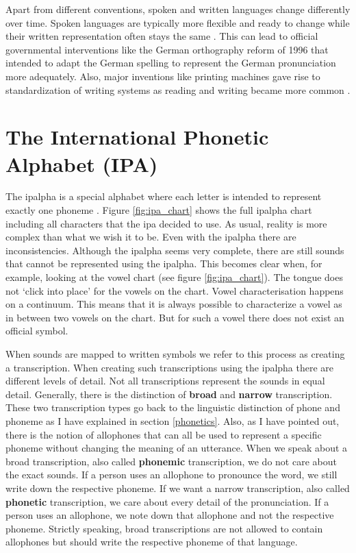 Apart from different conventions, spoken and written languages change differently over time. Spoken languages are typically more flexible and ready to change while their written representation often stays the same \citep{unicode-lingu}. This can lead to official governmental interventions like the German orthography reform of 1996 that intended to adapt the German spelling to represent the German pronunciation more adequately. Also, major inventions like printing machines gave rise to standardization of writing systems as reading and writing became more common \citep{writing-systems}.

\section{The International Phonetic Alphabet (IPA)}
\label{sec:ipa}
The \ac{ipalpha} is a special alphabet where each letter is intended to represent exactly one phoneme  \citep{writing-systems, Intro.2007}. Figure \ref{fig:ipa_chart} shows the full \ac{ipalpha} chart including all characters that the \ac{ipa} decided to use. As usual, reality is more complex than what we wish it to be. Even with the \ac{ipalpha} there are inconsistencies. Although the \ac{ipalpha} seems very complete, there are still sounds that cannot be represented using the \ac{ipalpha}. This becomes clear when, for example, looking at the vowel chart (see figure \ref{fig:ipa_chart}). The tongue does not `click into place' for the vowels on the chart. Vowel characterisation happens on a continuum. This means that it is always possible to characterize a vowel as in between two vowels on the chart. But for such a vowel there does not exist an official symbol.

When sounds are mapped to written symbols we refer to this process as creating a transcription. When creating such transcriptions using the \ac{ipalpha} there are different levels of detail. Not all transcriptions represent the sounds in equal detail. Generally, there is the distinction of \textbf{broad} and \textbf{narrow} transcription. These two transcription types go back to the linguistic distinction of phone and phoneme as I have explained in section \ref{phonetics}. Also, as I have pointed out, there is the notion of allophones that can all be used to represent a specific phoneme without changing the meaning of an utterance. When we speak about a broad transcription, also called \textbf{phonemic} transcription, we do not care about the exact sounds. If a person uses an allophone to pronounce the word, we still write down the respective phoneme. If we want a narrow transcription, also called \textbf{phonetic} transcription, we care about every detail of the pronunciation. If a person uses an allophone, we note down that allophone and not the respective phoneme. Strictly speaking, broad transcriptions are not allowed to contain allophones but should write the respective phoneme of that language. 

